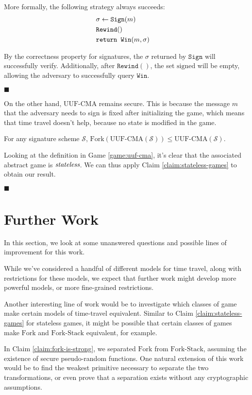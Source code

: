 More formally, the following strategy always succeeds:
$$
\begin{aligned}
&\sigma \gets \texttt{Sign}(m)\cr
&\texttt{Rewind}()\cr
&\texttt{return } \texttt{Win}(m, \sigma)\cr
\end{aligned}
$$

By the correctness property for signatures, the $\sigma$ returned
by $\texttt{Sign}$ will successfully verify.
Additionally, after $\texttt{Rewind}()$, the set $\text{signed}$
will be empty, allowing the adversary to successfully query $\texttt{Win}$.

$\blacksquare$

On the other hand, $\text{UUF-CMA}$ remains secure.
This is because the message $m$ that the adversary needs to sign
is fixed after initializing the game, which means that time travel
doesn't help, because no state is modified in the game.


\begin{claim}
\label{claim:uuf-cpa-secure}
For any signature scheme $\mathcal{S}$,
$\text{Fork}(\text{UUF-CMA}(\mathcal{S})) \leq \text{UUF-CMA}(\mathcal{S})$.
\end{claim}

Looking at the definition in Game \ref{game:uuf-cma}, it's clear
that the associated abstract game is $\emph{stateless}$.
We can thus apply Claim \ref{claim:stateless-games} to obtain our result.

$\blacksquare$

\section{Further Work}

In this section, we look at some unanswered questions and possible
lines of improvement for this work.

While we've considered a handful of different models for time travel,
along with restrictions for these models, we expect that further work
might develop more powerful models, or more fine-grained restrictions.

Another interesting line of work would be to investigate which classes
of game make certain models of time-travel equivalent.
Similar to Claim \ref{claim:stateless-games} for stateless games,
it might be possible that certain classes of games make
$\text{Fork}$ and $\text{Fork-Stack}$ equivalent, for example.

In Claim \ref{claim:fork-is-strong}, we separated $\text{Fork}$
from $\text{Fork-Stack}$, assuming the existence of secure
pseudo-random functions.
One natural extension of this work would be to find the weakest
primitive necessary to separate the two transformations, or
even prove that a separation exists without any cryptographic assumptions.

